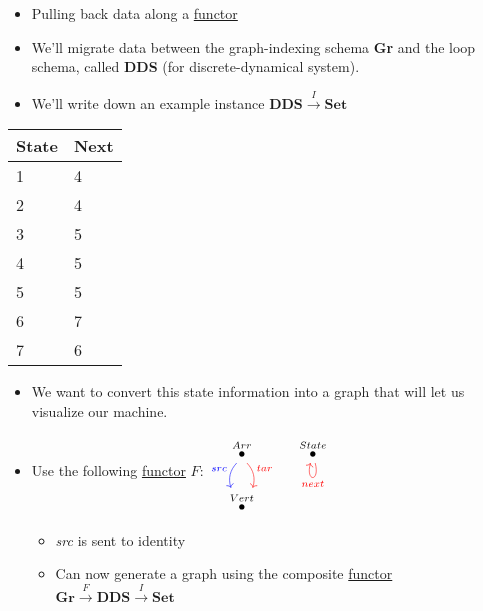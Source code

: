 \begin{itemize}
    \item  Pulling back data along a \hyperref[D3.35]{functor}
    \item We'll migrate data between the graph-indexing schema \textbf{Gr} and the loop schema, called \textbf{DDS} (for discrete-dynamical system).
    \item We'll write down an example instance $\mathbf{DDS}\xrightarrow{I}\mathbf{Set}$
  \end{itemize}

  \begin{minipage}{0.48\textwidth}

    \begin{tabular}{|l|l|}
      \hline
      State & Next \\ \hline
      1     & 4    \\ \hline
      2     & 4    \\ \hline
      3     & 5    \\ \hline
      4     & 5    \\ \hline
      5     & 5    \\ \hline
      6     & 7    \\ \hline
      7     & 6    \\ \hline
    \end{tabular}
  \end{minipage}

  \begin{itemize}
    \item  We want to convert this state information into a graph that will let us visualize our machine.
    \item Use the following \hyperref[D3.35]{functor} $F$: $\begin{tikzcd}\overset{Arr}\bullet \arrow[red,d, "tar", bend left] \arrow[blue,d, "src"', bend right] &\overset{State}\bullet \arrow[red, loop below, "next"] \\\overset{Vert}\bullet&\end{tikzcd}$
          \begin{itemize}
            \item \emph{src} is sent to identity
            \item Can now generate a graph using the composite \hyperref[D3.35]{functor} $\mathbf{Gr}\xrightarrow{F}\mathbf{DDS}\xrightarrow{I}\mathbf{Set}$
          \end{itemize}
  \end{itemize}

